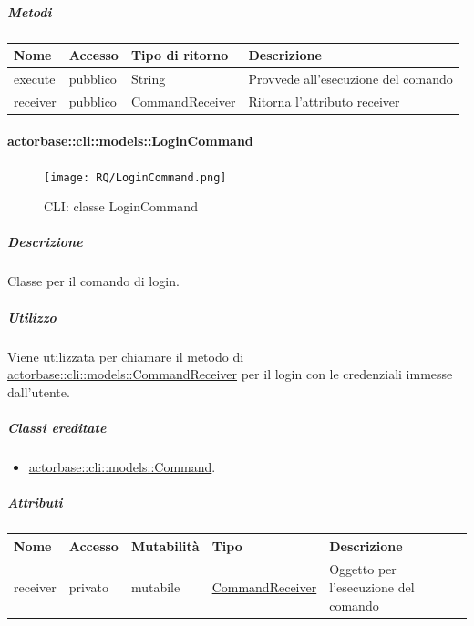 \documentclass{scalatekids-article}
\begin{document}
\subparagraph{Metodi}

\begin{tabular}{| l | l | l | l |}
  \hline
  Nome & Accesso & Tipo di ritorno & Descrizione\\
  \hline
  execute & pubblico & String & Provvede all'esecuzione del comando\\
  \hline
  receiver & pubblico & \hyperref[sec:actorbase::cli::models::CommandReceiver]{CommandReceiver} & Ritorna l'attributo receiver\\
  \hline
\end{tabular}

\paragraph{actorbase::cli::models::LoginCommand}
\label{sec:actorbase::cli::models::LoginCommand}

\begin{figure}[H]
  \begin{center}
    \texttt{[image: RQ/LoginCommand.png]}
    \caption{CLI: classe LoginCommand}
  \end{center}
\end{figure}

\subparagraph{Descrizione}

Classe per il comando di login.

\subparagraph{Utilizzo}

Viene utilizzata per chiamare il metodo di
\hyperref[sec:actorbase::cli::models::CommandReceiver]{actorbase::cli::models::CommandReceiver} per il login con le credenziali
immesse dall'utente.

\subparagraph{Classi ereditate}

\begin{itemize}
\item \hyperref[sec:actorbase::cli::models::Command]{actorbase::cli::models::Command}.
\end{itemize}

\subparagraph{Attributi}

\begin{tabular}{| p{1cm} | p{1.5cm} | p{2cm} | p{4cm} | p{8.5cm} |}
  \hline
  Nome & Accesso & Mutabilità & Tipo & Descrizione\\
  \hline
  receiver & privato & mutabile & \hyperref[sec:actorbase::cli::models::CommandReceiver]{CommandReceiver} & Oggetto per l'esecuzione del comando\\
  \hline
\end{tabular}
\end{document}
